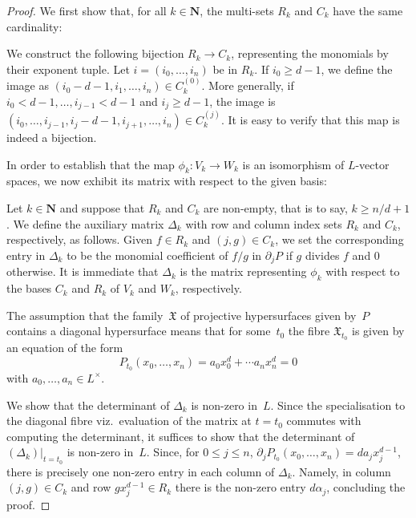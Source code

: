 \documentclass[a4paper,11pt]{article}
\numberwithin{equation}{section}
\newcommand{\NN}{\mathbf{N}} %
\renewcommand{\to}{\rightarrow}        %
\theoremstyle{definition}
\begin{document}
\begin{proof}
We first show that, for all $k \in \NN$, the multi-sets $R_k$ and $C_k$ 
have the same cardinality:

We construct the following bijection $R_k \to C_k$, representing the 
monomials by their exponent tuple.  Let $i = (i_0, \dotsc, i_n)$ be in 
$R_k$.  If $i_0 \geq d-1$, we define the image as
 $(i_0-d-1, i_1, \dotsc, i_n) \in C_k^{(0)}$.  More generally, if 
$i_0 < d-1, \dotsc, i_{j-1} < d-1$ and $i_j \geq d-1$, the image is 
$(i_0, \dotsc, i_{j-1}, i_j-d-1, i_{j+1}, \dotsc, i_n) \in C_k^{(j)}$.  
It is easy to verify that this map is indeed a bijection.

In order to establish that the map $\phi_k \colon V_k \to W_k$ is an 
isomorphism of $L$-vector spaces, we now exhibit its matrix with respect to 
the given basis:

Let $k \in \NN$ and suppose that $R_k$ and $C_k$ are non-empty, that is 
to say, $k \geq n/d + 1$.  We define the auxiliary matrix $\Delta_k$ with 
row and column index sets $R_k$ and $C_k$, respectively, as follows.  
Given $f \in R_k$ and $(j,g) \in C_k$, we set the corresponding entry in 
$\Delta_k$ to be the monomial coefficient of $f/g$ in $\partial_j P$ if 
$g$ divides $f$ and $0$ otherwise.  It is immediate that $\Delta_k$ is the 
matrix representing $\phi_k$ with respect to the bases $C_k$ and $R_k$ of 
$V_k$ and $W_k$, respectively.

The assumption that the family~$\mathfrak{X}$ of projective hypersurfaces 
given by~$P$ contains a diagonal hypersurface means that for some~$t_0$ 
the fibre $\mathfrak{X}_{t_0}$ is given by an equation of the form 
\begin{equation}
P_{t_0}(x_0, \dotsc, x_n) = a_0 x_0^d + \dotsb a_n x_n^d = 0
\end{equation}
with $a_0, \dotsc, a_n \in L^{\times}$.

We show that the determinant of $\Delta_k$ is non-zero in~$L$.  Since 
the specialisation to the diagonal fibre viz.\ evaluation of the matrix at 
$t = t_0$ commutes with computing the determinant, it suffices to show that 
the determinant of $(\Delta_k) \big |_{t=t_0}$ is non-zero in~$L$.
Since, for $0 \leq j \leq n$, 
$\partial_j P_{t_0} (x_0, \dotsc, x_n) = d a_j x_j^{d-1}$, there is 
precisely one non-zero entry in each column of $\Delta_k$.  Namely, in column 
$(j, g) \in C_k$ and row $g x_j^{d-1} \in R_k$ there is the non-zero entry 
$d \alpha_j$, concluding the proof.
\end{proof}
\end{document}
